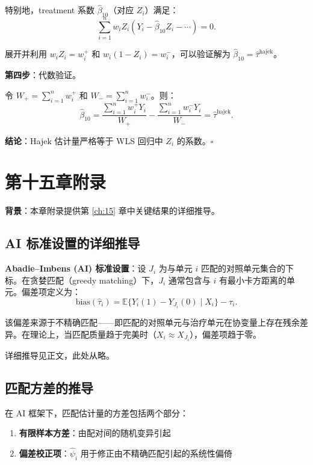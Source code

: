 特别地，treatment 系数 $\hat\beta_{10}$（对应 $Z_i$）满足：
\[
\sum_{i=1}^n w_i Z_i (Y_i - \hat\beta_{10} Z_i - \cdots) = 0.
\]

展开并利用 $w_i Z_i = w_i^+$ 和 $w_i (1-Z_i) = w_i^-$，可以验证解为 $\hat\beta_{10} = \hat\tau^{\text{hajek}}$。

\textbf{第四步}：代数验证。

令 $W_+ = \sum_{i=1}^n w_i^+$ 和 $W_- = \sum_{i=1}^n w_i^-$。则：
\[
\hat\beta_{10} = \frac{\sum_{i=1}^n w_i^+ Y_i}{W_+} - \frac{\sum_{i=1}^n w_i^- Y_i}{W_-} = \hat\tau^{\text{hajek}}.
\]

\textbf{结论}：Hajek 估计量严格等于 WLS 回归中 $Z_i$ 的系数。$\square$

\section{第十五章附录}\label{sec:appendix-15-ai-theory}\label{sec:appendix-15-matching-variance}\label{sec:appendix-15-bias-correction}\label{sec:appendix-15-dr-proof}\label{sec:appendix-15-dr-att-proof}

\textbf{背景}：本章附录提供第 \ref{ch:15} 章中关键结果的详细推导。

\subsection{AI 标准设置的详细推导}

\textbf{Abadie--Imbens (AI) 标准设置}：设 $J_i$ 为与单元 $i$ 匹配的对照单元集合的下标。在贪婪匹配（greedy matching）下，$J_i$ 通常包含与 $i$ 有最小卡方距离的单元。偏差项定义为：
\[
\mathrm{bias}(\hat\tau_i) = \mathbb{E}\bigl\{ Y_i(1) - Y_{J_i}(0) \mid X_i \bigr\} - \tau_i .
\]

该偏差来源于不精确匹配——即匹配的对照单元与治疗单元在协变量上存在残余差异。在理论上，当匹配质量趋于完美时（$X_i \approx X_{J_i}$），偏差项趋于零。

详细推导见正文，此处从略。

\subsection{匹配方差的推导}

在 AI 框架下，匹配估计量的方差包括两个部分：
\begin{enumerate}
  \item \textbf{有限样本方差}：由配对间的随机变异引起
  \item \textbf{偏差校正项}：$\hat\psi_i$ 用于修正由不精确匹配引起的系统性偏倚
\end{enumerate}

